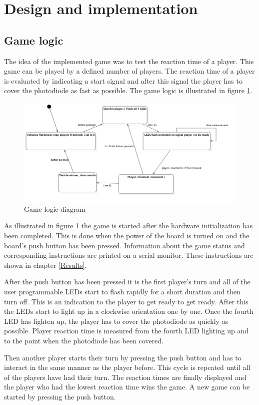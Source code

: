 \pagebreak


\section{Design and implementation}
\subsection{Game logic}
The idea of the implemented game was to test the reaction time of a player. This game can be played by a defined number of players. The reaction time of a player is evaluated by indicating a start signal and after this signal the player has to cover the photodiode as fast as possible. The game logic is illustrated in figure \ref{fig:GameLogicDiagram}. 

\begin{figure}[htbp]
  \centering
     \includegraphics[width=1\textwidth]{./figures/FSM_Diagram.png}
  \caption{Game logic diagram}
  \label{fig:GameLogicDiagram}
\end{figure}

As illustrated in figure \ref{fig:GameLogicDiagram} the game is started after the hardware initialization has been completed. This is done when the power of the board is turned on and the board's push button has been pressed. Information about the game status and corresponding instructions are printed on a serial monitor. These instructions are shown in chapter \ref{Results}.\\
\par
After the push button has been pressed it is the first player's turn and all of the user programmable LEDs start to flash rapidly for a short duration and then turn off. This is an indication to the player to get ready to get ready. After this the LEDs start to light up in a clockwise orientation one by one. Once the fourth LED has lighten up, the player has to cover the photodiode as quickly as possible. Player reaction time is measured from the fourth LED lighting up and to the point when the photodiode has been covered.\\ 
\par
Then another player starts their turn by pressing the push button and has to interact in the same manner as the player before. This cycle is repeated until all of the players have had their turn. The reaction times are finally displayed and the player who had the lowest reaction time wins the game. A new game can be started by pressing the push button.

